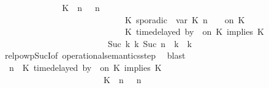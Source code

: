 \begin{isabellebody}
\ \ \ \ \ \ \ \ \ \ \isamarkupfalse%
\ \isamarkupfalse%
\ {\isacartoucheopen}{\isacharparenleft}\ {\isacharparenleft}{\isacharparenleft}K\ {\isasymUp}\ n{\isacharparenright}\ {\isacharhash}\ {\isasymGamma}{\isacharparenright}{\isacharcomma}\ n\isanewline
\ \ \ \ \ \ \ \ \ \ \ \ \ \ \ \ \ \ \ \ \ \ \ \ \ \ \ \ {\isasymturnstile}\ {\isacharparenleft}K\ sporadic{\isasymsharp}\ {\isasymlparr}\ {\isasymtau}\isactrlsub v\isactrlsub a\isactrlsub r\ {\isacharparenleft}K\ n{\isacharparenright}\ {\isasymoplus}\ {\isasymdelta}{\isasymtau}\ {\isasymrparr}\ on\ K\ {\isacharhash}\ {\isasymPsi}\isanewline
\ \ \ \ \ \ \ \ \ \ \ \ \ \ \ \ \ \ \ \ \ \ \ \ \ \ \ \ {\isasymtriangleright}\ {\isacharparenleft}{\isacharparenleft}K\ time{\isacharminus}delayed{\isasymsharp}\ by\ {\isasymdelta}{\isasymtau}\ on\ K\ implies\ K\ {\isacharhash}\ {\isasymPhi}{\isacharparenright}{\isacharparenright}\isanewline
\ \ \ \ \ \ \ \ \ \ \ \ \ \ \ \ \ \ \ \ \ \ \ \ \ {\isasymhookrightarrow}\isactrlbsup Suc\ k\isactrlesup \ {\isacharparenleft}{\isasymGamma}\isactrlsub k{\isacharcomma}\ Suc\ n\ {\isasymturnstile}\ {\isasymPsi}\isactrlsub k\ {\isasymtriangleright}\ {\isasymPhi}\isactrlsub k{\isacharparenright}{\isacartoucheclose}\isanewline
\ \ \ \ \ \ \ \ \ \ \ \ \isamarkupfalse%
\ relpowp{\isacharunderscore}Suc{\isacharunderscore}I{}{\isacharbrackleft}of\ {\isacartoucheopen}operational{\isacharunderscore}semantics{\isacharunderscore}step{\isacartoucheclose}{\isacharbrackright}\ \isamarkupfalse%
\ blast\ \isanewline
\ \ \ \ \ \ \ \ \ \ \isamarkupfalse%
\ \isamarkupfalse%
\ {\isacartoucheopen}{\isacharparenleft}{\isasymGamma}{\isacharcomma}\ n\ {\isasymturnstile}\ {\isacharparenleft}{\isacharparenleft}K\ time{\isacharminus}delayed{\isasymsharp}\ by\ {\isasymdelta}{\isasymtau}\ on\ K\ implies\ K\ {\isacharhash}\ {\isasymPsi}{\isacharparenright}\ {\isasymtriangleright}\ {\isasymPhi}{\isacharparenright}\isanewline
\ \ \ \ \ \ \ \ \ \ \ \ \ \ \ \ \ \ \ \ \ \ {\isasymhookrightarrow}\ {\isacharparenleft}\ {\isacharparenleft}{\isacharparenleft}K\ {\isasymUp}\ n{\isacharparenright}\ {\isacharhash}\ {\isasymGamma}{\isacharparenright}{\isacharcomma}\ n\isanewline

\end{isabellebody}
